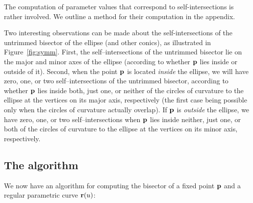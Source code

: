 The computation of parameter values that correspond to self-intersections is
rather involved.
We outline a method for their computation in the appendix.

\begin{rmk}
Two interesting observations can be made about
the self-intersections of the untrimmed bisector of the ellipse (and other
conics), as illustrated in Figure~\ref{fig:symm}.
First, the self--intersections of the untrimmed bisector lie on
the major and minor axes of the ellipse
(according to whether ${\bf p}$ lies inside or outside of it). 
Second, when the point ${\bf p}$ is located {\it inside\/} the ellipse, we will
have zero, one, or two self--intersections of the untrimmed bisector,
according to whether ${\bf p}$ lies inside both, just one, or
neither of the circles of curvature to the ellipse at the vertices on
its major axis, respectively (the first case being possible only when
the circles of curvature actually overlap). 
If ${\bf p}$ is {\it
outside\/} the ellipse, we have zero, one, or two self--intersections
when ${\bf p}$ lies inside neither, just one, or both of the
circles of curvature to the ellipse at the vertices on its minor axis,
respectively.
\end{rmk}


\subsection{The algorithm}
\label{sec:algorithm}

We now have an algorithm for computing the bisector of a fixed point
${\bf p}$ and a regular parametric curve ${\bf r}(u)$:

